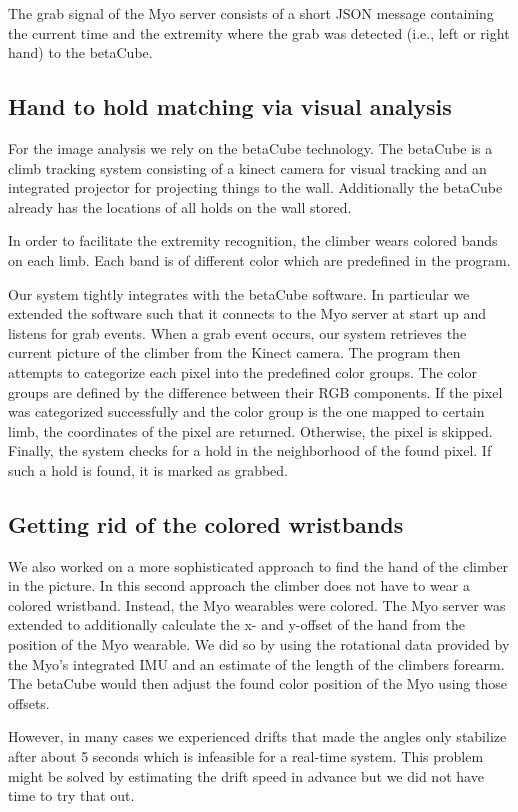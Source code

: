 The grab signal of the Myo server consists of a short JSON message containing the current time and the extremity where the grab was detected (i.e., left or right hand) to the betaCube.

\subsection{Hand to hold matching via visual analysis}
For the image analysis we rely on the betaCube technology.
The betaCube is a climb tracking system consisting of a kinect camera for visual tracking and an integrated projector for projecting things to the wall.
Additionally the betaCube already has the locations of all holds on the wall stored.

In order to facilitate the extremity recognition, the climber wears colored bands on each limb.
Each band is of different color which are predefined in the program.

Our system tightly integrates with the betaCube software.
In particular we extended the software such that it connects to the Myo server at start up and listens for grab events.
When a grab event occurs, our system retrieves the current picture of the climber from the Kinect camera.
The program then attempts to categorize each pixel into the predefined color groups.
The color groups are defined by the difference between their RGB components.
If the pixel was categorized successfully and the color group is the one mapped to certain limb, the coordinates of the pixel are returned.
Otherwise, the pixel is skipped.
Finally, the system checks for a hold in the neighborhood of the found pixel.
If such a hold is found, it is marked as grabbed.

\subsection{Getting rid of the colored wristbands}
We also worked on a more sophisticated approach to find the hand of the climber in the picture.
In this second approach the climber does not have to wear a colored wristband.
Instead, the Myo wearables were colored.
The Myo server was extended to additionally calculate the x- and y-offset of the hand from the position of the Myo wearable.
We did so by using the rotational data provided by the Myo's integrated IMU and an estimate of the length of the climbers forearm.
The betaCube would then adjust the found color position of the Myo using those offsets.

However, in many cases we experienced drifts that made the angles only stabilize after about 5 seconds which is infeasible for a real-time system.
This problem might be solved by estimating the drift speed in advance but we did not have time to try that out.

